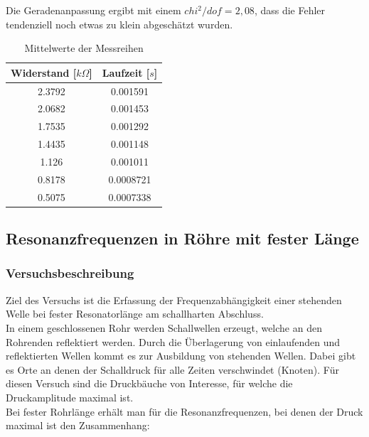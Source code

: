 \documentclass[12pt,a4paper]{article}
\begin{document}
	Die Geradenanpassung ergibt mit einem $chi^2/dof = 2,08$, dass die Fehler tendenziell noch etwas zu klein abgeschätzt wurden.
	\begin{table}
		\begin{center}
			\begin{tabular}{|c|c|}
				\hline
				\textbf{Widerstand [$k\Omega$]} & \textbf{Laufzeit [$s$]} \\
				\hline
				2.3792 & 0.001591 \\
				\hline
				2.0682 & 0.001453 \\
				\hline
				1.7535 & 0.001292 \\
				\hline
				1.4435 & 0.001148 \\
				\hline
				1.126 & 0.001011 \\
				\hline
				0.8178 & 0.0008721 \\
				\hline
				0.5075 &  0.0007338 \\
				\hline
			\end{tabular}
		\end{center}
		\caption{Mittelwerte der Messreihen}
	\end{table}











\subsection{Resonanzfrequenzen in Röhre mit fester Länge}

\subsubsection{Versuchsbeschreibung}

Ziel des Versuchs ist die Erfassung der Frequenzabhängigkeit einer stehenden Welle bei fester Resonatorlänge am schallharten Abschluss.\\
In einem geschlossenen Rohr werden Schallwellen erzeugt, welche an den Rohrenden reflektiert werden. Durch die Überlagerung von einlaufenden und reflektierten Wellen kommt es zur Ausbildung von stehenden Wellen. Dabei gibt es Orte an denen der Schalldruck für alle Zeiten verschwindet (Knoten). Für diesen Versuch sind die Druckbäuche von Interesse, für welche die Druckamplitude maximal ist.\\
Bei fester Rohrlänge erhält man für die Resonanzfrequenzen, bei denen der Druck maximal ist den Zusammenhang:
\end{document}
